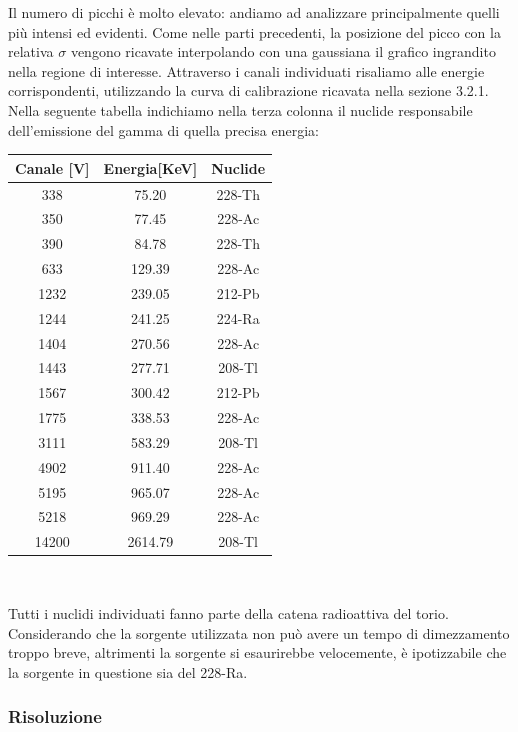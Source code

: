 \documentclass[a4paper,10pt]{article}
\begin{document}
Il numero di picchi è molto elevato: andiamo ad analizzare principalmente quelli più intensi ed evidenti. Come nelle parti precedenti, la posizione del picco con la relativa $\sigma$ vengono ricavate interpolando con una gaussiana il grafico ingrandito nella regione di interesse. Attraverso i canali individuati risaliamo alle energie corrispondenti, utilizzando la curva di calibrazione ricavata nella sezione 3.2.1. Nella seguente tabella indichiamo nella terza colonna il nuclide responsabile dell'emissione del gamma di quella precisa energia:

\begin{center}
    \begin{tabular}{ccc}
        \toprule
        Canale [V] & Energia[KeV] & Nuclide\\
        \midrule
	  338 & 75.20 & 228-Th\\
	  350 & 77.45 & 228-Ac\\
	  390 & 84.78 & 228-Th\\
	  633 & 129.39 & 228-Ac\\
	  1232 & 239.05 & 212-Pb\\
	  1244 & 241.25 & 224-Ra\\
	  1404 & 270.56 & 228-Ac\\
	  1443 & 277.71 & 208-Tl\\
	  1567 & 300.42 & 212-Pb\\
	  1775 & 338.53 & 228-Ac\\
	  3111 & 583.29 & 208-Tl\\
	  4902 & 911.40 & 228-Ac\\
	  5195 & 965.07 & 228-Ac\\
	  5218 & 969.29 & 228-Ac\\
	  14200 & 2614.79 & 208-Tl\\
        \bottomrule
    \end{tabular}\\
\end{center}

Tutti i nuclidi individuati fanno parte della catena radioattiva del torio. Considerando che la sorgente utilizzata non può avere un tempo di dimezzamento troppo breve, altrimenti la sorgente si esaurirebbe velocemente, è ipotizzabile che la sorgente in questione sia del 228-Ra.

\subsubsection{Risoluzione}
\end{document}
